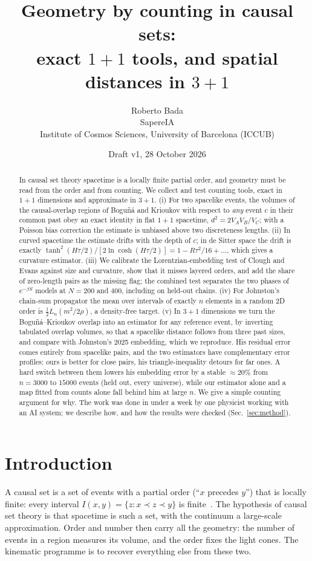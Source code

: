 \documentclass[11pt,a4paper]{article}
\title{Geometry by counting in causal sets:\\ exact $1+1$ tools, and spatial distances in $3+1$}
\author{Roberto Bada\\ \small SapereIA\\ \small Institute of Cosmos Sciences, University of Barcelona (ICCUB)}  %
\date{Draft v1, 28 October 2026}
\begin{document}
\maketitle

\begin{abstract}
In causal set theory spacetime is a locally finite partial order, and geometry must be read from the order and from counting. We collect and test counting tools, exact in $1+1$ dimensions and approximate in $3+1$. (i) For two spacelike events, the volumes of the causal-overlap regions of Bogu\~n\'a and Krioukov with respect to \emph{any} event $c$ in their common past obey an exact identity in flat $1+1$ spacetime, $d^2=2V_AV_B/V_C$; with a Poisson bias correction the estimate is unbiased above two discreteness lengths. (ii) In curved spacetime the estimate drifts with the depth of $c$; in de Sitter space the drift is exactly $\tanh^2(H\tau/2)/[2\ln\cosh(H\tau/2)]=1-R\tau^2/16+\dots$, which gives a curvature estimator. (iii) We calibrate the Lorentzian-embedding test of Clough and Evans against size and curvature, show that it misses layered orders, and add the share of zero-length pairs as the missing flag; the combined test separates the two phases of $e^{-\beta S}$ models at $N=200$ and $400$, including on held-out chains. (iv) For Johnston's chain-sum propagator the mean over intervals of exactly $n$ elements in a random 2D order is $\tfrac12L_n(m^2/2\rho)$, a density-free target. (v) In $3+1$ dimensions we turn the Bogu\~n\'a--Krioukov overlap into an estimator for any reference event, by inverting tabulated overlap volumes, so that a spacelike distance follows from three past sizes, and compare with Johnston's 2025 embedding, which we reproduce. His residual error comes entirely from spacelike pairs, and the two estimators have complementary error profiles: ours is better for close pairs, his triangle-inequality detours for far ones. A hard switch between them lowers his embedding error by a stable $\approx20\%$ from $n=3000$ to $15000$ events (held out, every universe), while our estimator alone and a map fitted from counts alone fall behind him at large $n$. We give a simple counting argument for why. The work was done in under a week by one physicist working with an AI system; we describe how, and how the results were checked (Sec.~\ref{sec:method}).
\end{abstract}

\section{Introduction}
A causal set is a set of events with a partial order (``$x$ precedes $y$'') that is locally finite: every interval $I(x,y)=\{z:x\prec z\prec y\}$ is finite~\cite{BLMS87,Surya19}. The hypothesis of causal set theory is that spacetime is such a set, with the continuum a large-scale approximation. Order and number then carry all the geometry: the number of events in a region measures its volume, and the order fixes the light cones. The kinematic programme is to recover everything else from these two.
\end{document}

